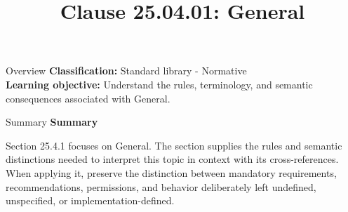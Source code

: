 \documentclass[10pt,letterpaper]{article}
\title{Clause 25.04.01: General}
\author{}
\date{}
\begin{document}
\maketitle
\begin{CornellOverviewBox}{Overview}
\textbf{Classification:} Standard library - Normative\\[2pt]
\textbf{Learning objective:} Understand the rules, terminology, and semantic consequences associated with General.
\end{CornellOverviewBox}\begin{CornellSummaryBox}{Summary}
{\sffamily\bfseries\color{Accent} Summary}\par\vspace{3pt}Section 25.4.1 focuses on General. The section supplies the rules and semantic distinctions needed to interpret this topic in context with its cross-references. When applying it, preserve the distinction between mandatory requirements, recommendations, permissions, and behavior deliberately left undefined, unspecified, or implementation-defined.
\end{CornellSummaryBox}
\end{document}
